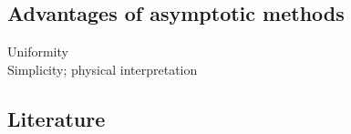 \documentclass[twocolumn,secnumarabic,amssymb, nobibnotes, aps, prd]{revtex4-1}
\begin{document}
  
 

 

\subsection{Advantages of asymptotic methods}
Uniformity\\
Simplicity; physical interpretation


\subsection{Literature}
\end{document}
